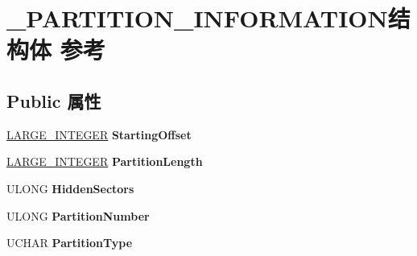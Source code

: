 \hypertarget{struct___p_a_r_t_i_t_i_o_n___i_n_f_o_r_m_a_t_i_o_n}{}\section{\+\_\+\+P\+A\+R\+T\+I\+T\+I\+O\+N\+\_\+\+I\+N\+F\+O\+R\+M\+A\+T\+I\+O\+N结构体 参考}
\label{struct___p_a_r_t_i_t_i_o_n___i_n_f_o_r_m_a_t_i_o_n}
\subsection*{Public 属性}
\begin{DoxyCompactItemize}
\item 
\mbox{\label{struct___p_a_r_t_i_t_i_o_n___i_n_f_o_r_m_a_t_i_o_n_a0e1ca966441bae21cbeffdab014a938c}} 
\hyperlink{union___l_a_r_g_e___i_n_t_e_g_e_r}{L\+A\+R\+G\+E\+\_\+\+I\+N\+T\+E\+G\+ER} {\bfseries Starting\+Offset}
\item 
\mbox{\label{struct___p_a_r_t_i_t_i_o_n___i_n_f_o_r_m_a_t_i_o_n_a1918a75c7a257642fc36216a526c996b}} 
\hyperlink{union___l_a_r_g_e___i_n_t_e_g_e_r}{L\+A\+R\+G\+E\+\_\+\+I\+N\+T\+E\+G\+ER} {\bfseries Partition\+Length}
\item 
\mbox{\label{struct___p_a_r_t_i_t_i_o_n___i_n_f_o_r_m_a_t_i_o_n_ab18b97cca729ce374817c0ac743ac151}} 
U\+L\+O\+NG {\bfseries Hidden\+Sectors}
\item 
\mbox{\label{struct___p_a_r_t_i_t_i_o_n___i_n_f_o_r_m_a_t_i_o_n_afe6dda3f982cbfd4bd9274945555fd67}} 
U\+L\+O\+NG {\bfseries Partition\+Number}
\item 
\mbox{\label{struct___p_a_r_t_i_t_i_o_n___i_n_f_o_r_m_a_t_i_o_n_a7d9ba54e3803178da603861b26a96b06}} 
U\+C\+H\+AR {\bfseries Partition\+Type}
\item 
\mbox{\label{struct___p_a_r_t_i_t_i_o_n___i_n_f_o_r_m_a_t_i_o_n_a721bc93f8667750af0f20cb3597c2b56}} 

\end{DoxyCompactItemize}

